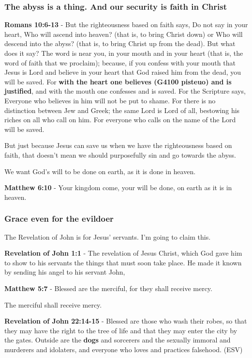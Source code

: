 \documentclass[11pt]{article}
\begin{document}
\subsubsection{The abyss is a thing. And our security is faith in Christ}
\label{sec:org6a191ef}
\textbf{Romans 10:6-13} - But the righteousness based on faith says, Do not say in your heart, Who will ascend into heaven? (that is, to bring Christ down) or Who will descend into the abyss? (that is, to bring Christ up from the dead).  But what does it say? The word is near you, in your mouth and in your heart (that is, the word of faith that we proclaim); because, if you confess with your mouth that Jesus is Lord and believe in your heart that God raised him from the dead, you will be saved.  For \textbf{with the heart one believes (G4100 pisteuo) and is justified}, and with the mouth one confesses and is saved.  For the Scripture says, Everyone who believes in him will not be put to shame.  For there is no distinction between Jew and Greek; the same Lord is Lord of all, bestowing his riches on all who call on him.  For everyone who calls on the name of the Lord will be saved.

But just because Jesus can save us when we have the righteousness based on faith, that doesn't mean we should purposefully sin and go towards the abyss.

We want God's will to be done on earth, as it is done in heaven.

\textbf{Matthew 6:10} - Your kingdom come, your will be done, on earth as it is in heaven.

\subsubsection{Grace even for the evildoer}
\label{sec:orgbc6e9c2}
The Revelation of John is for Jesus' servants. I'm going to claim this.

\textbf{Revelation of John 1:1} - The revelation of Jesus Christ, which God gave him to show to his servants the things that must soon take place. He made it known by sending his angel to his servant John,

\textbf{Matthew 5:7} - Blessed are the merciful, for they shall receive mercy.

The merciful shall receive mercy.

\textbf{Revelation of John 22:14-15} - Blessed are those who wash their robes, so that they may have the right to the tree of life and that they may enter the city by the gates. Outside are the \textbf{dogs} and sorcerers and the sexually immoral and murderers and idolaters, and everyone who loves and practices falsehood. (ESV)
\end{document}
